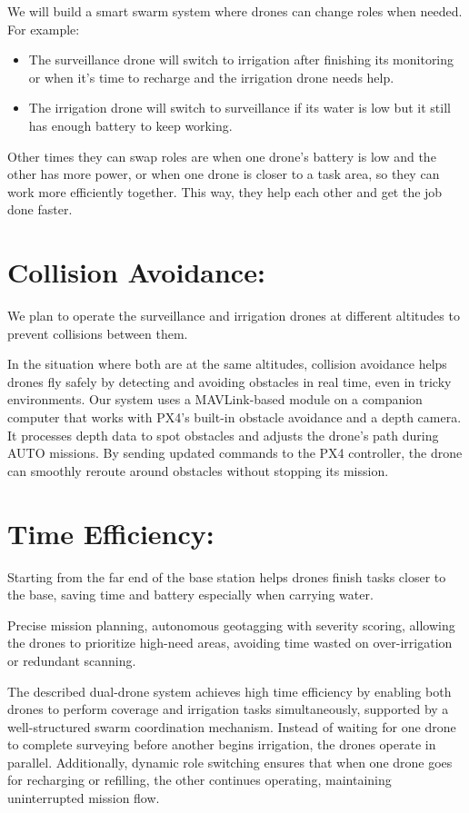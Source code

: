 \documentclass[12pt]{article}
\begin{document}
We will build a smart swarm system where drones can change roles when needed. For example:
\begin{itemize}
  \item The surveillance drone will switch to irrigation after finishing its monitoring or when it’s time to recharge and the irrigation drone needs help.
  \item The irrigation drone will switch to surveillance if its water is low but it still has enough battery to keep working.
\end{itemize}
Other times they can swap roles are when one drone’s battery is low and the other has more power, or when one drone is closer to a task area, so they can work more efficiently together. This way, they help each other and get the job done faster.

\section*{Collision Avoidance:}
We plan to operate the surveillance and irrigation drones at different altitudes to prevent collisions between them.

In the situation where both are at the same altitudes, collision avoidance helps drones fly safely by detecting and avoiding obstacles in real time, even in tricky environments. Our system uses a MAVLink-based module on a companion computer that works with PX4’s built-in obstacle avoidance and a depth camera. It processes depth data to spot obstacles and adjusts the drone’s path during AUTO missions. By sending updated commands to the PX4 controller, the drone can smoothly reroute around obstacles without stopping its mission.

\section*{Time Efficiency:}
Starting from the far end of the base station helps drones finish tasks closer to the base, saving time and battery especially when carrying water.

Precise mission planning, autonomous geotagging with severity scoring, allowing the drones to prioritize high-need areas, avoiding time wasted on over-irrigation or redundant scanning.

The described dual-drone system achieves high time efficiency by enabling both drones to perform coverage and irrigation tasks simultaneously, supported by a well-structured swarm coordination mechanism. Instead of waiting for one drone to complete surveying before another begins irrigation, the drones operate in parallel. Additionally, dynamic role switching ensures that when one drone goes for recharging or refilling, the other continues operating, maintaining uninterrupted mission flow.
\end{document}
